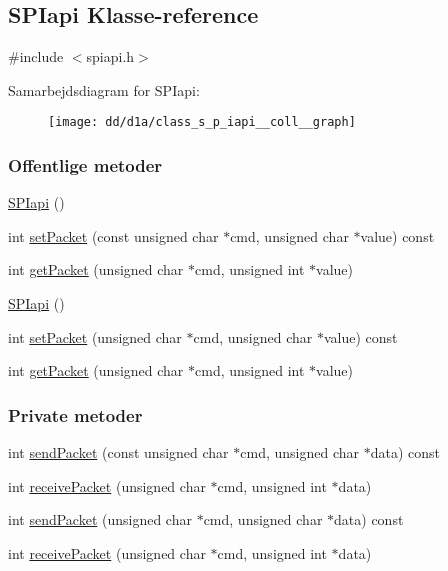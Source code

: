 \hypertarget{class_s_p_iapi}{}\subsection{S\+P\+Iapi Klasse-\/reference}
\label{class_s_p_iapi}


{\ttfamily \#include $<$spiapi.\+h$>$}



Samarbejdsdiagram for S\+P\+Iapi\+:\nopagebreak
\begin{figure}[H]
\begin{center}
\leavevmode
\texttt{[image: dd/d1a/class\_s\_p\_iapi\_\_coll\_\_graph]}
\end{center}
\end{figure}
\subsubsection*{Offentlige metoder}
\begin{DoxyCompactItemize}
\item 
\hyperlink{class_s_p_iapi_ae0ce1f581babcf0dab1d0559a352d514}{S\+P\+Iapi} ()
\item 
int \hyperlink{class_s_p_iapi_a197b3f71fa8f68516260bcb3b6985c6b}{set\+Packet} (const unsigned char $\ast$cmd, unsigned char $\ast$value) const 
\item 
int \hyperlink{class_s_p_iapi_afce62b978fa58c0ccefe336835cda0bb}{get\+Packet} (unsigned char $\ast$cmd, unsigned int $\ast$value)
\item 
\hyperlink{class_s_p_iapi_ae0ce1f581babcf0dab1d0559a352d514}{S\+P\+Iapi} ()
\item 
int \hyperlink{class_s_p_iapi_ad5902c2fbc9a0b0a4c807b9da5197fcf}{set\+Packet} (unsigned char $\ast$cmd, unsigned char $\ast$value) const 
\item 
int \hyperlink{class_s_p_iapi_afce62b978fa58c0ccefe336835cda0bb}{get\+Packet} (unsigned char $\ast$cmd, unsigned int $\ast$value)
\end{DoxyCompactItemize}
\subsubsection*{Private metoder}
\begin{DoxyCompactItemize}
\item 
int \hyperlink{class_s_p_iapi_aeeb857d3584d80daa2588a4d971b248e}{send\+Packet} (const unsigned char $\ast$cmd, unsigned char $\ast$data) const 
\item 
int \hyperlink{class_s_p_iapi_a65cbe59b0788556afcfdcac59de1752a}{receive\+Packet} (unsigned char $\ast$cmd, unsigned int $\ast$data)
\item 
int \hyperlink{class_s_p_iapi_a8159ee4c56139354ea1302bb64b99a2d}{send\+Packet} (unsigned char $\ast$cmd, unsigned char $\ast$data) const 
\item 
int \hyperlink{class_s_p_iapi_a65cbe59b0788556afcfdcac59de1752a}{receive\+Packet} (unsigned char $\ast$cmd, unsigned int $\ast$data)
\end{DoxyCompactItemize}


